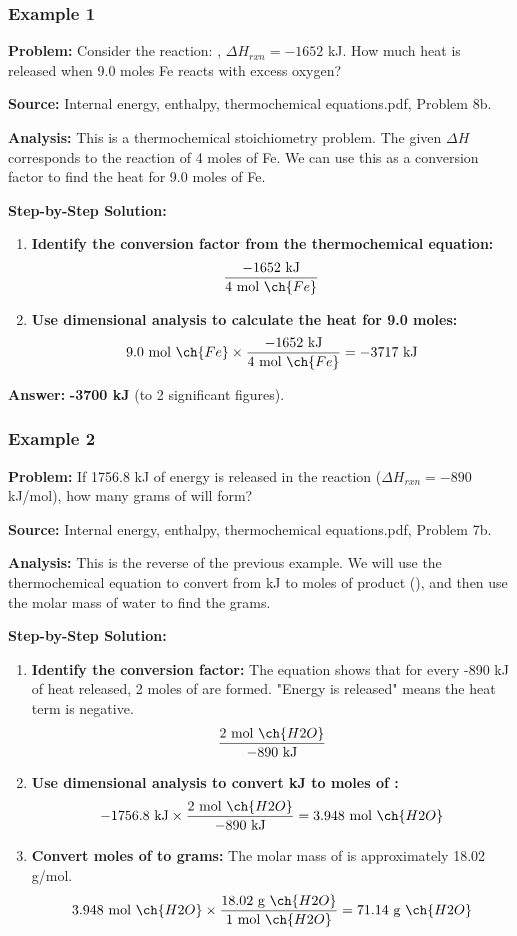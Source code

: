 \documentclass{article}
\begin{document}
\subsubsection{Example 1}
\textbf{Problem:} Consider the reaction: , $\Delta H_{rxn} = -1652$ kJ. How much heat is released when 9.0 moles Fe reacts with excess oxygen?

\textbf{Source:} Internal energy, enthalpy, thermochemical equations.pdf, Problem 8b.

\textbf{Analysis:} This is a thermochemical stoichiometry problem. The given $\Delta H$ corresponds to the reaction of 4 moles of Fe. We can use this as a conversion factor to find the heat for 9.0 moles of Fe.

\textbf{Step-by-Step Solution:}
\begin{enumerate}
    \item \textbf{Identify the conversion factor from the thermochemical equation:}
    \[ \frac{-1652 \text{ kJ}}{4 \text{ mol } \ch{Fe}} \]
    \item \textbf{Use dimensional analysis to calculate the heat for 9.0 moles:}
    \[ 9.0 \text{ mol } \ch{Fe} \times \frac{-1652 \text{ kJ}}{4 \text{ mol } \ch{Fe}} = -3717 \text{ kJ} \]
\end{enumerate}

\textbf{Answer:} \textbf{-3700 kJ} (to 2 significant figures).

\subsubsection{Example 2}
\textbf{Problem:} If 1756.8 kJ of energy is released in the reaction  ($\Delta H_{rxn} = -890$ kJ/mol), how many grams of  will form?

\textbf{Source:} Internal energy, enthalpy, thermochemical equations.pdf, Problem 7b.

\textbf{Analysis:} This is the reverse of the previous example. We will use the thermochemical equation to convert from kJ to moles of product (), and then use the molar mass of water to find the grams.

\textbf{Step-by-Step Solution:}
\begin{enumerate}
    \item \textbf{Identify the conversion factor:} The equation shows that for every -890 kJ of heat released, 2 moles of  are formed. "Energy is released" means the heat term is negative.
    \[ \frac{2 \text{ mol } \ch{H2O}}{-890 \text{ kJ}} \]
    \item \textbf{Use dimensional analysis to convert kJ to moles of :}
    \[ -1756.8 \text{ kJ} \times \frac{2 \text{ mol } \ch{H2O}}{-890 \text{ kJ}} = 3.948 \text{ mol } \ch{H2O} \]
    \item \textbf{Convert moles of  to grams:} The molar mass of  is approximately 18.02 g/mol.
    \[ 3.948 \text{ mol } \ch{H2O} \times \frac{18.02 \text{ g } \ch{H2O}}{1 \text{ mol } \ch{H2O}} = 71.14 \text{ g } \ch{H2O} \]
\end{enumerate}
\end{document}
